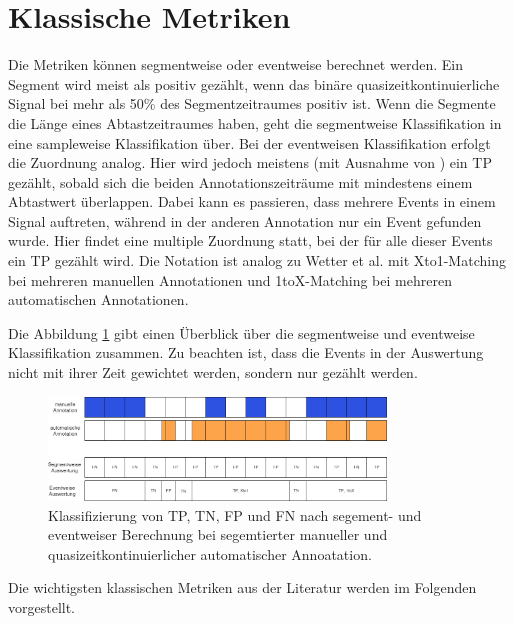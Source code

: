 \section{Klassische Metriken}



Die Metriken können segmentweise oder eventweise berechnet werden. Ein Segment wird meist als positiv gezählt, wenn das binäre quasizeitkontinuierliche Signal bei mehr als 50\% des Segmentzeitraumes positiv ist. Wenn die Segmente die Länge eines Abtastzeitraumes haben, geht die segmentweise Klassifikation in eine sampleweise Klassifikation über.
Bei der eventweisen Klassifikation erfolgt die Zuordnung analog. Hier wird jedoch meistens (mit Ausnahme von \cite{stefani}) ein TP gezählt, sobald sich die beiden Annotationszeiträume mit mindestens einem Abtastwert überlappen. Dabei kann es passieren, dass mehrere Events in einem Signal auftreten, während in der anderen Annotation nur ein Event gefunden wurde. Hier findet eine multiple Zuordnung statt, bei der für alle dieser Events ein TP gezählt wird. Die Notation ist analog zu Wetter et al. mit Xto1-Matching bei mehreren manuellen Annotationen und 1toX-Matching bei mehreren automatischen Annotationen.

Die Abbildung \ref{fig:Zuordnung} gibt einen Überblick über die segmentweise und eventweise Klassifikation zusammen. Zu beachten ist, dass die Events in der Auswertung nicht mit ihrer Zeit gewichtet werden, sondern nur gezählt werden. 

\begin{figure}[!ht]%
	\begin{center}
	\includegraphics[width=0.80\textwidth]{./Bilder/Zuordnung.png}
	\end{center}
	\caption{Klassifizierung von \gls{TP}, \gls{TN}, \gls{FP} und \gls{FN} nach segement- und eventweiser Berechnung bei segemtierter manueller und quasizeitkontinuierlicher automatischer Annoatation.}%
	\label{fig:Zuordnung}%
\end{figure}

Die wichtigsten klassischen Metriken aus der Literatur werden im Folgenden vorgestellt.\\

